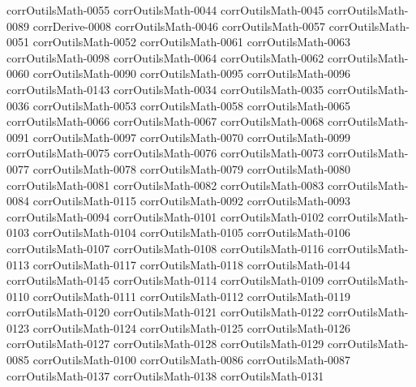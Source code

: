 {corrOutilsMath-0055}
{corrOutilsMath-0044}
{corrOutilsMath-0045}
{corrOutilsMath-0089}
{corrDerive-0008}
{corrOutilsMath-0046}
{corrOutilsMath-0057}
{corrOutilsMath-0051}
{corrOutilsMath-0052}
{corrOutilsMath-0061}
{corrOutilsMath-0063}
{corrOutilsMath-0098}
{corrOutilsMath-0064}
{corrOutilsMath-0062}
{corrOutilsMath-0060}
{corrOutilsMath-0090}
{corrOutilsMath-0095}
{corrOutilsMath-0096}
{corrOutilsMath-0143}
{corrOutilsMath-0034}
{corrOutilsMath-0035}
{corrOutilsMath-0036}
{corrOutilsMath-0053}
{corrOutilsMath-0058}
{corrOutilsMath-0065}
{corrOutilsMath-0066}
{corrOutilsMath-0067}
{corrOutilsMath-0068}
{corrOutilsMath-0091}
{corrOutilsMath-0097}
{corrOutilsMath-0070}
{corrOutilsMath-0099}
{corrOutilsMath-0075}
{corrOutilsMath-0076}
{corrOutilsMath-0073}
{corrOutilsMath-0077}
{corrOutilsMath-0078}
{corrOutilsMath-0079}
{corrOutilsMath-0080}
{corrOutilsMath-0081}
{corrOutilsMath-0082}
{corrOutilsMath-0083}
{corrOutilsMath-0084}
{corrOutilsMath-0115}
{corrOutilsMath-0092}
{corrOutilsMath-0093}
{corrOutilsMath-0094}
{corrOutilsMath-0101}
{corrOutilsMath-0102}
{corrOutilsMath-0103}
{corrOutilsMath-0104}
{corrOutilsMath-0105}
{corrOutilsMath-0106}
{corrOutilsMath-0107}
{corrOutilsMath-0108}
{corrOutilsMath-0116}
{corrOutilsMath-0113}
{corrOutilsMath-0117}
{corrOutilsMath-0118}
{corrOutilsMath-0144}
{corrOutilsMath-0145}
{corrOutilsMath-0114}
{corrOutilsMath-0109}
{corrOutilsMath-0110}
{corrOutilsMath-0111}
{corrOutilsMath-0112}
{corrOutilsMath-0119}
{corrOutilsMath-0120}
{corrOutilsMath-0121}
{corrOutilsMath-0122}
{corrOutilsMath-0123}
{corrOutilsMath-0124}
{corrOutilsMath-0125}
{corrOutilsMath-0126}
{corrOutilsMath-0127}
{corrOutilsMath-0128}
{corrOutilsMath-0129}
{corrOutilsMath-0085}
{corrOutilsMath-0100}
{corrOutilsMath-0086}
{corrOutilsMath-0087}
{corrOutilsMath-0137}
{corrOutilsMath-0138}
{corrOutilsMath-0131}
